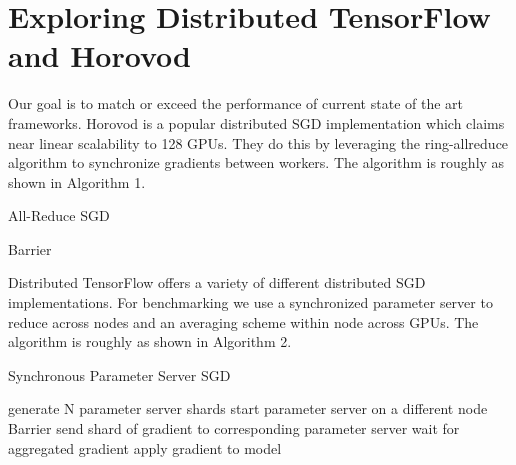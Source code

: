 \section{Exploring Distributed TensorFlow and Horovod}

Our goal is to match or exceed the performance of current state of the art frameworks. Horovod is a popular distributed SGD implementation which claims near linear scalability to 128 GPUs. They do this by leveraging the ring-allreduce algorithm to synchronize gradients between workers. The algorithm is roughly as shown in Algorithm 1.

\begin{algorithm}
\scriptsize
\caption{All-Reduce SGD}
 {
}
Barrier\;

 {
}


 {
}
\end{algorithm}

Distributed TensorFlow offers a variety of different distributed SGD implementations. For benchmarking we use a synchronized parameter server to reduce across nodes and an averaging scheme within node across GPUs. The algorithm is roughly as shown in Algorithm 2.

\begin{algorithm}
\scriptsize
\caption{Synchronous Parameter Server SGD}
 {
}
generate N parameter server shards\;
 {
    start parameter server on a different node \;
}
Barrier\;
 {
send shard of gradient to corresponding parameter server \;
wait for aggregated gradient \;
apply gradient to model \;
}
\end{algorithm}

